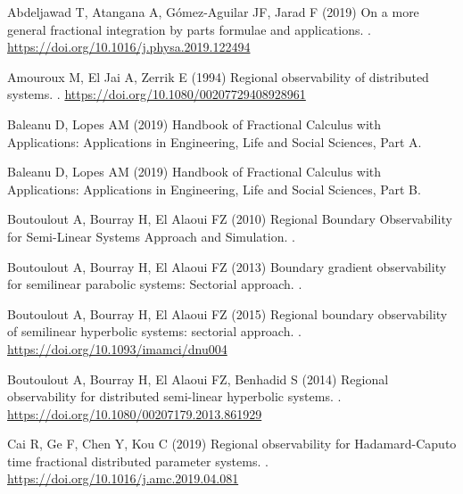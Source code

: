\documentclass{article}
\begin{document}
\begin{thebibliography}{xx}

Abdeljawad T, Atangana A, G\'{o}mez-Aguilar JF, Jarad F (2019)
\newblock On a more general fractional integration by parts formulae and applications.
.
\url{https://doi.org/10.1016/j.physa.2019.122494}

Amouroux M, El Jai A, Zerrik E (1994) 
\newblock Regional observability of distributed systems.
.
\url{https://doi.org/10.1080/00207729408928961}

Baleanu D, Lopes AM (2019)
\newblock Handbook of Fractional Calculus with Applications: 
Applications in Engineering, Life and Social Sciences, Part A.

Baleanu D, Lopes AM (2019) 
\newblock Handbook of Fractional Calculus with Applications: 
Applications in Engineering, Life and Social Sciences, Part B. 

Boutoulout A, Bourray H, El Alaoui FZ (2010) 
\newblock Regional Boundary Observability 
for Semi-Linear Systems Approach and Simulation. 
.

Boutoulout A, Bourray H, El Alaoui FZ (2013)
\newblock Boundary gradient observability 
for semilinear parabolic systems: Sectorial approach.
.

Boutoulout A, Bourray H, El Alaoui FZ (2015)
\newblock Regional boundary observability of 
semilinear hyperbolic systems: sectorial approach.
. 
\url{https://doi.org/10.1093/imamci/dnu004}

Boutoulout A, Bourray H, El Alaoui FZ, Benhadid S (2014) 
\newblock Regional observability for distributed 
semi-linear hyperbolic systems.
.  
\url{https://doi.org/10.1080/00207179.2013.861929}

Cai R, Ge F, Chen Y, Kou C (2019) 
\newblock Regional observability for Hadamard-Caputo 
time fractional distributed parameter systems. 
.
\url{https://doi.org/10.1016/j.amc.2019.04.081}


\end{thebibliography}
\end{document}

